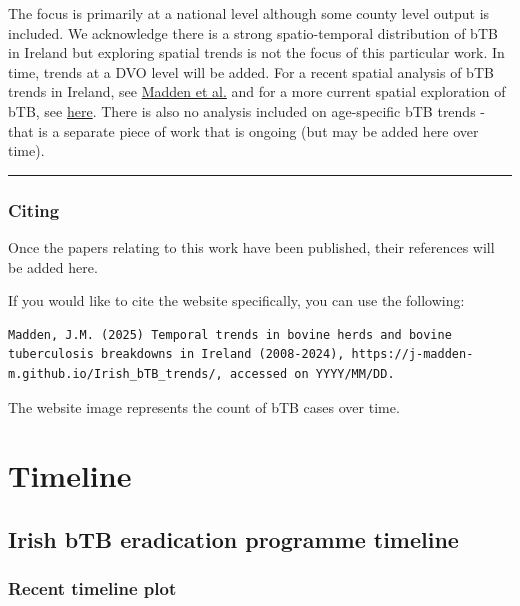 \documentclass[
  letterpaper,
  DIV=11,
  numbers=noendperiod]{scrreprt}
\begin{document}

The focus is primarily at a national level although some county level
output is included. We acknowledge there is a strong spatio-temporal
distribution of bTB in Ireland but exploring spatial trends is not the
focus of this particular work. In time, trends at a DVO level will be
added. For a recent spatial analysis of bTB trends in Ireland, see
\href{https://www.sciencedirect.com/science/article/pii/S187758452100040X}{Madden
et al.} and for a more current spatial exploration of bTB, see
\href{https://www.arcgis.com/apps/dashboards/9306f7eb60b1401a8b18f76f61f20aea}{here}.
There is also no analysis included on age-specific bTB trends - that is
a separate piece of work that is ongoing (but may be added here over
time).

\begin{center}\rule{0.5\linewidth}{0.5pt}\end{center}

\section*{Citing}\label{citing}


Once the papers relating to this work have been published, their
references will be added here.

If you would like to cite the website specifically, you can use the
following:

\begin{verbatim}
Madden, J.M. (2025) Temporal trends in bovine herds and bovine tuberculosis breakdowns in Ireland (2008-2024), https://j-madden-m.github.io/Irish_bTB_trends/, accessed on YYYY/MM/DD.
\end{verbatim}

The website image represents the count of bTB cases over time.

\part{Timeline}

\chapter{Irish bTB eradication programme timeline}\label{sec-timeline}

\section{Recent timeline plot}\label{recent-timeline-plot}
\end{document}
